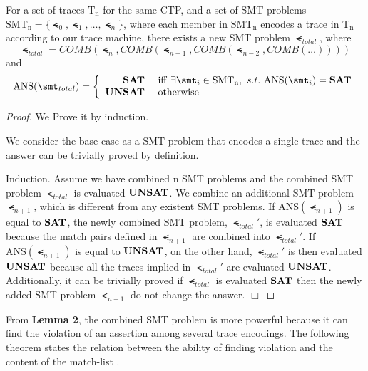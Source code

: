 \begin{lemma}
For a set of traces $\mathrm{T_n}$ for the same CTP, and a set of SMT problems $\mathrm{SMT_n} = \{\smt_0,\smt_{1},\ldots,\smt_{n}\}$, where each member in $\mathrm{SMT_n}$ encodes a trace in $\mathrm{T_n}$ according to our trace machine, there exists a new SMT problem $\smt_{total}$, where
\[\smt_{total} = \mathit{COMB}(\smt_n, \mathit{COMB}(\smt_{n-1}, \mathit{COMB}(\smt_{n-2}, \mathit{COMB}(\ldots ))))\]
and
\[
\mathrm{ANS}(\smt_{total}) = \left\{ \begin{array}{rl}
  \mathit{\cfgt{SAT}} &\ \mathrm{iff}\ \exists \smt_i \in \mathrm{SMT_n},\ s.t.\ \mathrm{ANS}(\smt_i) = \mathit{\cfgt{SAT}}  \\
  \mathit{\cfgt{UNSAT}} &\ \mathrm{otherwise}\
\end{array}
\right .
\]
\end{lemma}
\begin{proof}
We Prove it by induction.

We consider the base case as a SMT problem that encodes a single trace and the answer can be trivially proved by definition.

Induction. Assume we have combined n SMT problems and the combined SMT problem $\smt_{total}$ is evaluated $\mathit{\textbf{UNSAT}}$. We combine an additional SMT problem $\smt_{n+1}$, which is different from any existent SMT problems. If $\mathrm{ANS}(\smt_{n+1})$ is equal to $\mathit{\textbf{SAT}}$, the newly combined SMT problem, $\smt_{total}'$, is evaluated $\mathit{\textbf{SAT}}$ because the match pairs defined in $\smt_{n+1}$ are combined into $\smt_{total}'$. If $\mathrm{ANS}(\smt_{n+1})$ is equal to $\mathit{\textbf{UNSAT}}$, on the other hand, $\smt_{total}'$ is then evaluated $\mathit{\textbf{UNSAT}}$ because all the traces implied in $\smt_{total}'$ are evaluated $\mathit{\textbf{UNSAT}}$. Additionally, it can be trivially proved if $\smt_{total}$ is evaluated $\mathit{\textbf{SAT}}$ then the newly added SMT problem $\smt_{n+1}$ do not change the answer. $\Box$
\end{proof}

From \textbf{Lemma 2}, the combined SMT problem is more powerful because it can find the violation of an assertion among several trace encodings. The following theorem states the relation between the ability of finding violation and the content of the match-list \ml.

